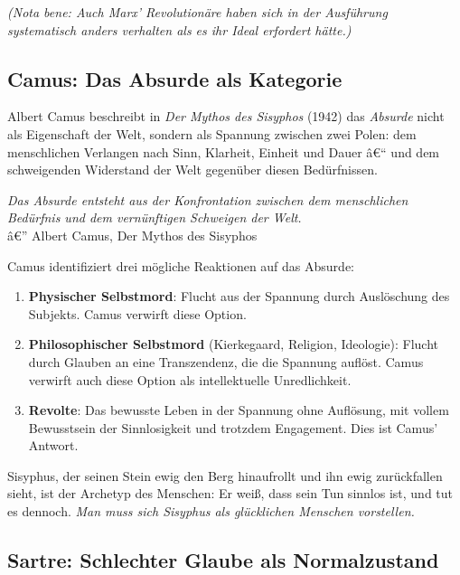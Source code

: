 ﻿\documentclass[12pt, a4paper]{article}
\begin{document}
\textit{(Nota bene: Auch Marx' Revolutionäre haben sich in der Ausführung\\
\hspace{0.5cm}systematisch anders verhalten als es ihr Ideal erfordert hätte.)}

\subsection{Camus: Das Absurde als Kategorie}

Albert Camus beschreibt in \textit{Der Mythos des Sisyphos} (1942) das
\emph{Absurde} nicht als Eigenschaft der Welt, sondern als Spannung zwischen
zwei Polen: dem menschlichen Verlangen nach Sinn, Klarheit, Einheit und Dauer â€“
und dem schweigenden Widerstand der Welt gegenüber diesen Bedürfnissen.

\begin{displayquote}
  \textit{Das Absurde entsteht aus der Konfrontation zwischen dem menschlichen
  Bedürfnis und dem vernünftigen Schweigen der Welt.}\\
  \hfill â€” Albert Camus, Der Mythos des Sisyphos
\end{displayquote}

Camus identifiziert drei mögliche Reaktionen auf das Absurde:
\begin{enumerate}
  \item \textbf{Physischer Selbstmord}: Flucht aus der Spannung durch Auslöschung
    des Subjekts. Camus verwirft diese Option.
  \item \textbf{Philosophischer Selbstmord} (Kierkegaard, Religion, Ideologie):
    Flucht durch Glauben an eine Transzendenz, die die Spannung auflöst.
    Camus verwirft auch diese Option als intellektuelle Unredlichkeit.
  \item \textbf{Revolte}: Das bewusste Leben in der Spannung ohne Auflösung,
    mit vollem Bewusstsein der Sinnlosigkeit und trotzdem Engagement. Dies
    ist Camus' Antwort.
\end{enumerate}

Sisyphus, der seinen Stein ewig den Berg hinaufrollt und ihn ewig zurückfallen
sieht, ist der Archetyp des Menschen: Er weiß, dass sein Tun sinnlos ist, und tut
es dennoch. \textit{Man muss sich Sisyphus als glücklichen Menschen vorstellen.}

\subsection{Sartre: Schlechter Glaube als Normalzustand}
\end{document}

